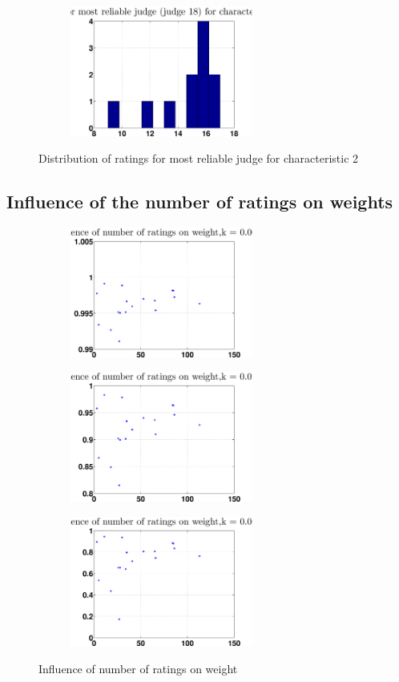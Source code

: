 \documentclass[12pt,a4paper]{article}
\begin{document}
\begin{figure}
\centering
\begin{subfigure}[b]{0.48\textwidth}
\includegraphics[width = 6cm]{noPreprocess/distribMostRelK660c2.eps}
\end{subfigure}
\caption{Distribution of ratings for most reliable judge for characteristic 2}
\end{figure}

\FloatBarrier
\subsection*{Influence of the number of ratings on weights}

\begin{figure}
\centering
\begin{subfigure}[b]{0.48\textwidth}
\includegraphics[width = 6cm]{noPreprocess/numRatvsWK10.eps}
\end{subfigure}
\begin{subfigure}[b]{0.48\textwidth}
\includegraphics[width = 6cm]{noPreprocess/numRatvsWK200.eps}
\end{subfigure}
\begin{subfigure}[b]{0.48\textwidth}
\includegraphics[width = 6cm]{noPreprocess/numRatvsWK660.eps}
\end{subfigure}
\caption{Influence of number of ratings on weight}
\end{figure}





\nocite{*}
\end{document}
